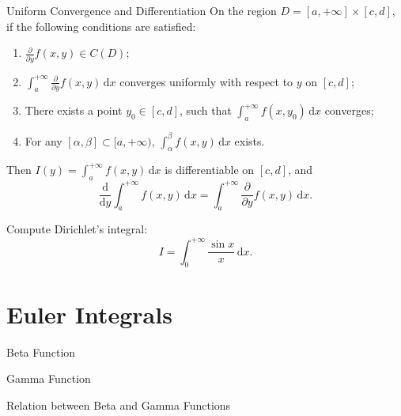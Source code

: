 \documentclass[11pt]{../../TexTemplate/elegantbook}
\begin{document}
\vspace{0.7cm}
\begin{theorem}{Uniform Convergence and Differentiation}
    On the region \(D = [a, +\infty] \times [c, d]\), if the following conditions are satisfied:
    \begin{enumerate}[label=(\roman*)]
        \item \(\frac{\partial }{\partial y}f(x, y) \in C(D)\);
        \item \(\int_{a}^{+\infty} \frac{\partial }{\partial y}f(x, y) \, \mathrm{d}x\) converges uniformly 
            with respect to \(y\) on \([c, d]\);
        \item There exists a point \(y_{0} \in [c, d]\), such that \(\int_{a}^{+\infty} f(x, y_{0}) \, \mathrm{d}x\) converges;
        \item For any \([\alpha, \beta]\subset [a, +\infty)\), \(\int_{\alpha}^{\beta} f(x, y) \, \mathrm{d}x\) exists.
    \end{enumerate}
    Then \(I(y) = \int_{a}^{+\infty} f(x, y) \, \mathrm{d}x\) is differentiable on \([c, d]\), and
    \[
    \frac{\mathrm{d}}{\mathrm{d}y} \int_{a}^{+\infty} f(x, y) \, \mathrm{d}x =
    \int_{a}^{+\infty} \frac{\partial }{\partial y} f(x, y) \, \mathrm{d}x.
    \]
\end{theorem}

\begin{example}
    Compute Dirichlet's integral:
    \[
    I = \int_{0}^{+\infty} \frac{\sin x}{x} \, \mathrm{d}x.
    \]
\end{example}
\begin{solution}

\end{solution}


\section{Euler Integrals}
\begin{leftbarTitle}{Beta Function}\end{leftbarTitle}

\begin{leftbarTitle}{Gamma Function}\end{leftbarTitle}

\begin{leftbarTitle}{Relation between Beta and Gamma Functions}\end{leftbarTitle}
\end{document}
